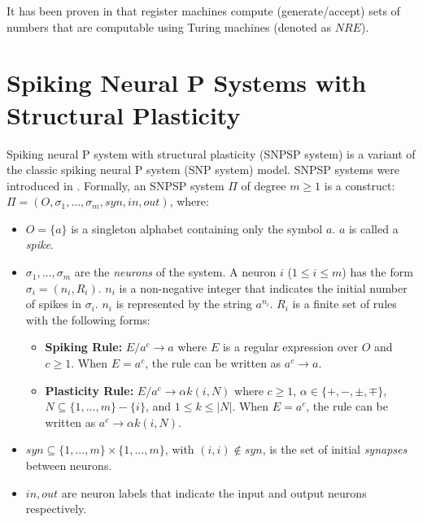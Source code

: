 \documentclass[smallextended]{svjour3}
\begin{document}
It has been proven in \cite{MINSKY} that register machines compute (generate/accept) sets of numbers that are computable using Turing machines
(denoted as $NRE$). 
  

\section{Spiking Neural P Systems with Structural Plasticity}\label{sec-snpsp}


\begin{definition}

Spiking neural P system with structural plasticity (SNPSP system) is a variant of the classic spiking neural P system (SNP system) model. SNPSP 
systems were introduced in \cite{cabarle-2015-structural-plasticity}. Formally, an SNPSP system $\Pi$ of degree $m \geq 1$ is  {a} construct: $\Pi =(O, \sigma_1,\ldots, \sigma_m, 
syn, in, out)$, where:

\begin{itemize}[label=$\circ$]
   \item  $O = \{a\}$ is a singleton alphabet containing only the symbol $a$. $a$ is called a \textit{spike}.
   \item $\sigma_1, \ldots, \sigma_m$ are the \textit{neurons} of the system. A neuron $i$ ($1 \leq i \leq m$) has the form $\sigma_i = (n_i, R_i)$. 
          $n_i$ is a non-negative integer that indicates the initial number of spikes in $\sigma_i$. $n_i$ is represented by the string $a^{n_i}$. 
          $R_i$ is a finite set of rules with the following forms:
          \begin{itemize}
             \item \textbf{Spiking Rule:} $E/a^c \rightarrow a$ where $E$ is a regular expression over $O$ and $c \geq 1$. When $E=a^c$, the rule can 
                   be written as $a^c \rightarrow a$.
             \item \textbf{Plasticity Rule:} $E/a^c \rightarrow \alpha k(i,N)$ where $c \geq 1$, $\alpha \in \{+,-,\pm,\mp\}$, $N \subseteq \{1,
                   \ldots,m\}-\{i\}$, and  $1 \leq k \leq |N|$. When $E=a^c$, the rule can be written as $a^c \rightarrow \alpha k(i,N)$.
          \end{itemize}
   \item $syn \subseteq \{1,\ldots,m\} \times \{1,\ldots,m\}$, with $(i,i) \not\in syn$, is the set of initial \textit{synapses} between neurons.
   \item $in,out$ are neuron labels that indicate the input and output neurons respectively.
\end{itemize}
 
\end{definition}
 
\end{document}
